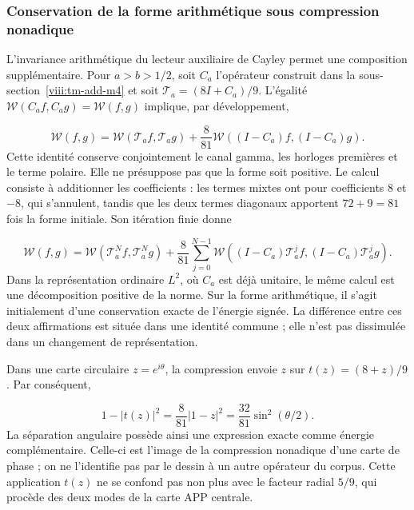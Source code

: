 \subsubsection{Conservation de la forme arithmétique sous compression nonadique}
\label{viii:tm-add-c4-1}
L'invariance arithmétique du lecteur auxiliaire de Cayley permet une composition supplémentaire. Pour \(a>b>1/2\), soit \(C_a\) l'opérateur construit dans la sous-section~\ref{viii:tm-add-m4} et soit \(\mathcal T_a=(8I+C_a)/9\). L'égalité \(\mathscr W(C_af,C_ag)=\mathscr W(f,g)\) implique, par développement,

\begin{equation}
\boxed{\mathscr W(f,g)=\mathscr W(\mathcal T_af,\mathcal T_ag)
+\frac8{81}\mathscr W((I-C_a)f,(I-C_a)g).}
\label{viii:tm-add-balance-aritmetico}
\end{equation}
Cette identité conserve conjointement le canal gamma, les horloges premières et le terme polaire. Elle ne présuppose pas que la forme soit positive. Le calcul consiste à additionner les coefficients : les termes mixtes ont pour coefficients \(8\) et \(-8\), qui s'annulent, tandis que les deux termes diagonaux apportent \(72+9=81\) fois la forme initiale. Son itération finie donne

\begin{equation}
\mathscr W(f,g)=\mathscr W(\mathcal T_a^Nf,\mathcal T_a^Ng)
+\frac8{81}\sum_{j=0}^{N-1}
\mathscr W((I-C_a)\mathcal T_a^jf,(I-C_a)\mathcal T_a^jg).
\label{viii:tm-add-balance-iterado}
\end{equation}
Dans la représentation ordinaire \(L^2\), où \(C_a\) est déjà unitaire, le même calcul est une décomposition positive de la norme. Sur la forme arithmétique, il s'agit initialement d'une conservation exacte de l'énergie signée. La différence entre ces deux affirmations est située dans une identité commune ; elle n'est pas dissimulée dans un changement de représentation.

Dans une carte circulaire \(z=e^{i\theta}\), la compression envoie \(z\) sur \(t(z)=(8+z)/9\). Par conséquent,

\[
1-|t(z)|^2=\frac8{81}|1-z|^2
=\frac{32}{81}\sin^2(\theta/2).
\]
La séparation angulaire possède ainsi une expression exacte comme énergie complémentaire. Celle-ci est l'image de la compression nonadique d'une carte de phase ; on ne l'identifie pas par le dessin à un autre opérateur du corpus. Cette application \(t(z)\) ne se confond pas non plus avec le facteur radial \(5/9\), qui procède des deux modes de la carte APP centrale.


